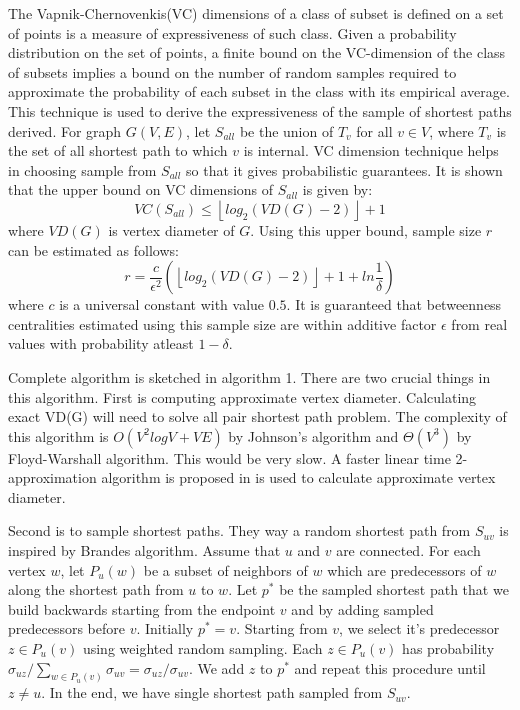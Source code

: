 \documentclass[runningheads,a4paper]{llncs}
\begin{document}
The Vapnik-Chernovenkis(VC) dimensions of a class of subset is defined on a set of points is a measure of expressiveness of such class. Given a probability distribution on the set of points, a finite bound on the VC-dimension of the class of subsets implies a bound on the number of random samples required to approximate the probability of each subset in the class with its empirical average. This technique is used to derive the expressiveness of the sample of shortest paths derived. For graph $G(V,E)$, let $S_{all}$ be the union of $T_{v}$ for all $v \in V$, where $T_{v}$ is the set of all shortest path to which $v$ is internal. VC dimension technique helps in choosing sample from $S_{all}$ so that it gives probabilistic guarantees. It is shown that the upper bound on VC dimensions of $S_{all}$ is given by:
$$VC(S_{all}) \leq \left\lfloor{log_{2}(VD(G) - 2)}\right\rfloor + 1$$
where $VD(G)$ is vertex diameter of $G$. Using this upper bound, sample size $r$ can be estimated as follows:
\begin{equation} \label{sample_size_algo}
r = \frac{c}{\epsilon^{2}}(\left\lfloor{log_{2}(VD(G) - 2)}\right\rfloor + 1 + ln\frac{1}{\delta})
\end{equation} 
where $c$ is a universal constant with value $0.5$. It is guaranteed that betweenness centralities estimated using this sample size are within additive factor $\epsilon$ from real values with probability atleast $1-\delta$. 

Complete algorithm is sketched in algorithm 1. There are two crucial things in this algorithm. First is computing approximate vertex diameter. Calculating exact VD(G) will need to solve all pair shortest  path problem. The complexity of this algorithm is $O(V^{2}logV + VE)$ by Johnson's algorithm\cite{johnson} and $\Theta(V^{3})$ by Floyd-Warshall algorithm. This would be very slow. A faster linear time 2-approximation algorithm is proposed in \cite{matteo} is used to calculate approximate vertex diameter. 

Second is to sample shortest paths. They way a random shortest path from $S_{uv}$ is inspired by Brandes algorithm\cite{brandes}. Assume that $u$ and $v$ are connected. For each vertex $w$, let $P_{u}(w)$ be a subset of neighbors of $w$ which are predecessors of $w$ along the shortest path from $u$ to $w$. Let $p^{*}$ be the sampled shortest path that we build backwards starting from the endpoint $v$ and by adding sampled predecessors before $v$. Initially $p^{*} = {v}$. Starting from $v$, we select it's predecessor $z \in P_{u}(v)$ using weighted random sampling. Each $z \in P_{u}(v)$ has probability $\sigma_{uz}/\sum_{w \in P_{u}(v)}\sigma_{uv} = \sigma_{uz}/\sigma_{uv}$. We add $z$ to $p^{*}$ and repeat this procedure until $z \neq u$. In the end, we have single shortest path sampled from $S_{uv}$. 
 
\end{document}
